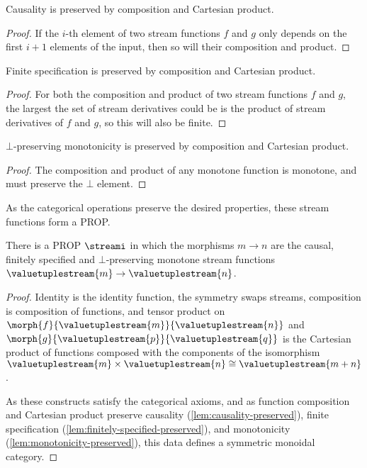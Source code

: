 \documentclass{lmcs}
\begin{document}
\begin{lem}\label{lem:causality-preserved}
    Causality is preserved by composition and Cartesian product.
\end{lem}
\begin{proof}
    If the \(i\)-th element of two stream functions \(f\) and \(g\) only depends
    on the first \(i+1\) elements of the input, then so will their composition
    and product.
\end{proof}

\begin{lem}\label{lem:finitely-specified-preserved}
    Finite specification is preserved by composition and Cartesian
    product.
\end{lem}
\begin{proof}
    For both the composition and product of two stream functions \(f\) and
    \(g\), the largest the set of stream derivatives could be is the product of
    stream derivatives of \(f\) and \(g\), so this will also be finite.
\end{proof}

\begin{lem}\label{lem:monotonicity-preserved}
    \(\bot\)-preserving monotonicity is preserved by composition and Cartesian
    product.
\end{lem}
\begin{proof}
    The composition and product of any monotone function is monotone, and must
    preserve the \(\bot\) element.
\end{proof}

As the categorical operations preserve the desired properties, these stream
functions form a PROP.

\begin{prop}
    There is a PROP \(\streami\) in which the morphisms \(m \to n\) are the
    causal, finitely specified and \(\bot\)-preserving monotone stream
    functions \(\valuetuplestream{m} \to \valuetuplestream{n}\).
\end{prop}
\begin{proof}
    Identity is the identity function, the symmetry swaps streams, composition
    is composition of functions, and tensor product on
    \(\morph{f}{\valuetuplestream{m}}{\valuetuplestream{n}}\) and
    \(\morph{g}{\valuetuplestream{p}}{\valuetuplestream{q}}\) is the Cartesian
    product of functions composed with the components of the isomorphism
    \(\valuetuplestream{m} \times \valuetuplestream{n}
    \cong \valuetuplestream{m+n}\).

    As these constructs satisfy the categorical axioms, and as function
    composition and Cartesian product preserve causality
    (\autoref{lem:causality-preserved}),
    finite specification (\autoref{lem:finitely-specified-preserved}),
    and monotonicity (\autoref{lem:monotonicity-preserved}), this data defines a
    symmetric monoidal category.
\end{proof}
\end{document}
